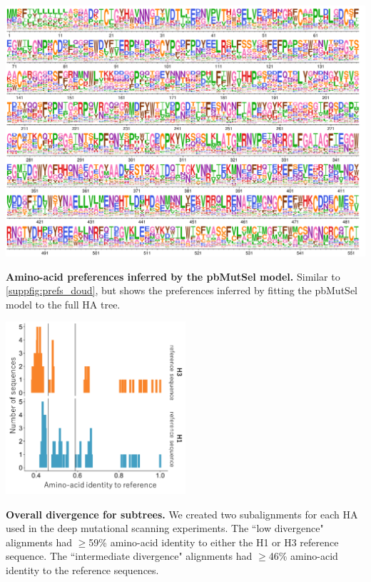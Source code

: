 \documentclass[11pt]{article}
\begin{document}
\begin{suppfig}[H]
\centerline{\includegraphics[width=\textwidth]{figures/prefs_mutSel}}
\caption{\label{suppfig:prefs_mutSel}
\textbf{Amino-acid preferences inferred by the pbMutSel model.}
Similar to \ref{suppfig:prefs_doud}, but shows the preferences inferred by fitting the pbMutSel model to the full HA tree.
}
\end{suppfig}
\clearpage 

\begin{suppfig}[H]
\centerline{\includegraphics[width=0.50\textwidth]{figures/divergence_distances.pdf}}
\caption{\label{suppfig:subalignments}
\textbf{Overall divergence for subtrees.}
We created two subalignments for each HA used in the deep mutational scanning experiments. 
The ``low divergence" alignments had $\ge$59\% amino-acid identity to either the H1 or H3 reference sequence. 
The ``intermediate divergence" alignments had $\ge$46\% amino-acid identity to the reference sequences.
}
\end{suppfig}
\clearpage 
\end{document}

